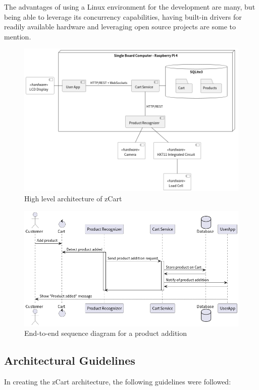 \documentclass[openright]{normas-utf-tex} %
\begin{document}
The advantages of using a Linux environment for the development are many, but
being able to leverage its concurrency capabilities, having built-in drivers
for readily available hardware and leveraging open source projects are some to
mention.

\begin{figure}[H]
	\centering
	\includegraphics[width=1\textwidth]{./images/zCart.png}
	\caption[High level architecture of zCart]{High level architecture of zCart}
	\label{fig:architecture}
\end{figure}


\begin{figure}[H]
	\centering
	\includegraphics[width=1\textwidth]{./images/E2E.png}
	\caption[End-to-end sequence diagram for a product addition]{End-to-end sequence diagram for a product addition}
	\label{fig:e2eseq}
\end{figure}

\subsection{Architectural Guidelines}
In creating the zCart architecture, the following guidelines were followed:
\end{document}
